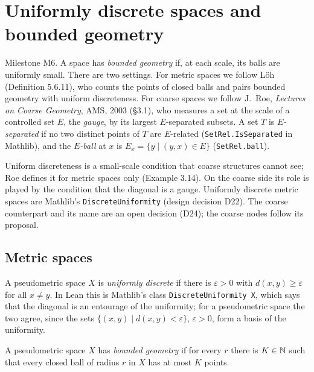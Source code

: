 \chapter{Uniformly discrete spaces and bounded geometry}
\label{chap:bounded-geometry}

Milestone M6. A space has \emph{bounded geometry} if, at each scale, its balls are uniformly
small. There are two settings. For metric spaces we follow L\"oh (Definition 5.6.11), who
counts the points of closed balls and pairs bounded geometry with uniform discreteness. For
coarse spaces we follow J.~Roe, \emph{Lectures on Coarse Geometry}, AMS, 2003 (\S3.1), who
measures a set at the scale of a controlled set $E$, the \emph{gauge}, by its largest
$E$-separated subsets. A set $T$ is \emph{$E$-separated} if no two distinct points of $T$ are
$E$-related (\texttt{SetRel.IsSeparated} in Mathlib), and the \emph{$E$-ball} at $x$ is
$E_x = \{y \mid (y, x) \in E\}$ (\texttt{SetRel.ball}).

Uniform discreteness is a small-scale condition that coarse structures cannot see; Roe defines
it for metric spaces only (Example 3.14). On the coarse side its role is played by the
condition that the diagonal is a gauge. Uniformly discrete metric spaces are Mathlib's
\texttt{DiscreteUniformity} (design decision D22). The coarse counterpart and its name are an
open decision (D24); the coarse nodes follow its proposal.

\section*{Metric spaces}

\begin{definition}
  \label{DiscreteUniformity}
  A pseudometric space $X$ is \emph{uniformly discrete} if there is $\varepsilon > 0$ with
  $d(x, y) \ge \varepsilon$ for all $x \ne y$. In Lean this is Mathlib's class
  \texttt{DiscreteUniformity X}, which says that the diagonal is an entourage of the
  uniformity; for a pseudometric space the two agree, since the sets
  $\{(x, y) \mid d(x, y) < \varepsilon\}$, $\varepsilon > 0$, form a basis of the uniformity.
\end{definition}

\begin{definition}
  \label{Metric.HasBoundedGeometry}
  A pseudometric space $X$ has \emph{bounded geometry} if for every $r$ there is $K \in \mathbb{N}$
  such that every closed ball of radius $r$ in $X$ has at most $K$ points.
\end{definition}

